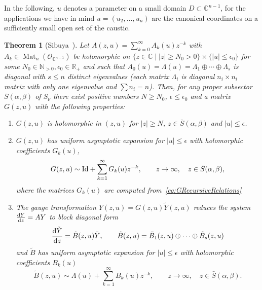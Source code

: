 \documentclass[pdftex]{sigma}
\numberwithin{equation}{section}
\newtheorem{Theorem}{Theorem}[section]
\begin{document}
In the following, $u$ denotes a parameter on a small domain $D\subset\mathbb{C}^{n-1}$, for the applications we have in mind $u=(u_{2},\dots,u_{n})$ are the canonical coordinates on a sufficiently small open set of the caustic.
\begin{Theorem}[Sibuya~\cite{Sibuya}]
 Let $A(z,u)=\sum_{k=0}^{\infty}A_{k}(u)z^{-k}$ with $A_{k}\in \operatorname{Mat}_{n}(\mathcal{O}_{\mathbb{C}^{n-1}})$ be holomorphic on $\{ z\in\mathbb{C} \mid |z| \geq N_{0}>0 \}\times\{ |u|\leq\epsilon_{0} \}$ for some $N_{0}\in\mathbb{N}_{>0},\epsilon_{0}\in\mathbb{R}_{+}$ and such that $A_{0}(u)=\Lambda(u)=\Lambda_{1}\oplus\cdots\oplus\Lambda_{s}$ is diagonal with $s\leq n$ distinct eigenvalues \big(each matrix $\Lambda_{i}$ is diagonal $n_{i}\times n_{i}$ matrix with only one eigenvalue and $\sum n_{i}=n$\big). Then, for any proper subsector~$\bar{S}(\alpha,\beta)$ of $S_{\nu}$ there exist positive numbers $N\geq N_{0}$, $\epsilon\leq\epsilon_{0}$ and a matrix $G(z,u)$ with the following properties:
 \begin{enumerate}\itemsep=0pt
 \item[$1.$] $G(z,u)$ is holomorphic in $(z,u)$ for $|z|\geq N$, $z\in\bar{S}(\alpha,\beta)$ and $|u|\leq\epsilon$.
 \item[$2.$] $G(z,u)$ has uniform asymptotic expansion for $|u|\leq\epsilon$ with holomorphic coefficients $G_{k}(u)$,
 \begin{equation*}
 G(z,u)\sim {\rm Id}+\sum_{k=1}^{\infty}G_{k}(u)z^{-k},\qquad z\rightarrow\infty,\quad z\in\bar{S}(\alpha,\beta),
 \end{equation*}
 where the matrices $G_{k}(u)$ are computed from~\eqref{eq:GRecursiveRelations}
 \item[$3.$] The gauge transformation $Y(z,u)=G(z,u)\tilde{Y}(z,u)$ reduces the system $\tfrac{{\rm d}Y}{{\rm d}z}=AY$ to block diagonal form
 \begin{equation*}
 \frac{{\rm d}\tilde{Y}}{{\rm d}z}=\tilde{B}(z,u)\tilde{Y},\qquad \tilde{B}(z,u)=\tilde{B}_{1}(z,u)\oplus\cdots\oplus \tilde{B}_{s}(z,u)
 \end{equation*}
 and $\tilde{B}$ has uniform asymptotic expansion for $|u|\leq\epsilon$ with holomorphic coefficients $B_{k}(u)$
 \begin{equation*}
 \tilde{B}(z,u)\sim\Lambda(u)+\sum_{k=1}^{\infty}B_{k}(u)z^{-k},\qquad z\rightarrow\infty,\quad z\in\bar{S}(\alpha,\beta).
 \end{equation*}
 \end{enumerate}
\end{Theorem}
\end{document}
